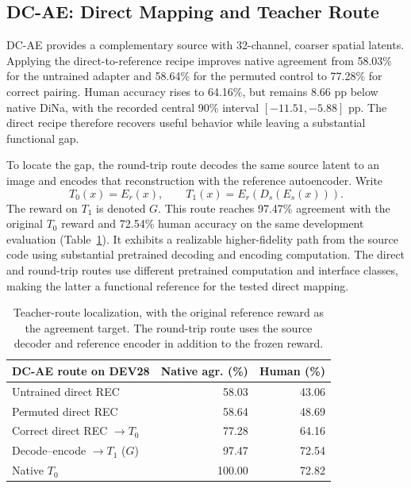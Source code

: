 \documentclass[10pt,twocolumn,letterpaper]{article}
\begin{document}
\subsection{DC-AE: Direct Mapping and Teacher Route}
\label{sec:dcae}
DC-AE provides a complementary source with 32-channel, coarser spatial latents. Applying the direct-to-reference recipe improves native agreement from 58.03\% for the untrained adapter and 58.64\% for the permuted control to 77.28\% for correct pairing. Human accuracy rises to 64.16\%, but remains 8.66 pp below native DiNa, with the recorded central 90\% interval $[-11.51,-5.88]$ pp. The direct recipe therefore recovers useful behavior while leaving a substantial functional gap.

To locate the gap, the round-trip route decodes the same source latent to an image and encodes that reconstruction with the reference autoencoder. Write
\begin{equation}
 T_0(x)=E_r(x),\qquad T_1(x)=E_r(D_s(E_s(x))).
 \label{eq:targets}
\end{equation}
The reward on $T_1$ is denoted $G$. This route reaches 97.47\% agreement with the original $T_0$ reward and 72.54\% human accuracy on the same development evaluation (Table~\ref{tab:dcae}). It exhibits a realizable higher-fidelity path from the source code using substantial pretrained decoding and encoding computation. The direct and round-trip routes use different pretrained computation and interface classes, making the latter a functional reference for the tested direct mapping.

\begin{table}[t]
\centering\small
\begin{tabular}{lrr}
\toprule
DC-AE route on DEV28&Native agr. (\%)&Human (\%)\\
\midrule
Untrained direct REC&58.03&43.06\\
Permuted direct REC&58.64&48.69\\
Correct direct REC $\to T_0$&77.28&64.16\\
Decode--encode $\to T_1$ ($G$)&97.47&72.54\\
Native $T_0$&100.00&72.82\\
\bottomrule
\end{tabular}
\caption{Teacher-route localization, with the original reference reward as the agreement target. The round-trip route uses the source decoder and reference encoder in addition to the frozen reward.}
\label{tab:dcae}
\end{table}
\end{document}
